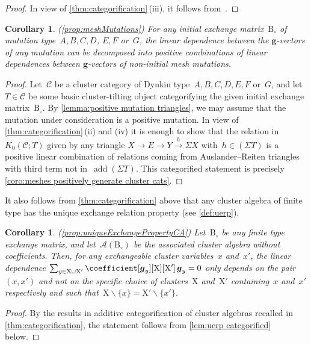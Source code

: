 \documentclass{amsart}
\newtheorem{corollary}[theorem]{Corollary}
\theoremstyle{definition}
\renewcommand{\b}[1]{{\boldsymbol{#1}}} %
\newcommand{\ssm}{\smallsetminus} %
\newcommand{\cluster}{\mathrm{X}} %
\newcommand{\B}{\mathrm{B}} %
\newcommand{\cat}{\mathcal{C}}
\newcommand{\susp}{\Sigma}
\newcommand{\add}{\operatorname{add}}
\begin{document}
\begin{proof}
In view of \cref{thm:categorification}\,(iii), it follows from~\cite[Lem.~3.3]{Palu}.
\end{proof}

\begin{corollary}\emph{(\cref{prop:meshMutations})}
\label{corollary:proof of prop meshMutations}
For any initial exchange matrix~$\B_\circ$ of mutation type~$A, B, C, D$, $E, F$ or~$G$, the linear dependence between the $\b{g}$-vectors of any mutation can be decomposed into positive combinations of linear dependences between $\b{g}$-vectors of non-initial mesh mutations.
\end{corollary}

\begin{proof}
Let~$\cat$ be a cluster category of Dynkin type~$A,B,C,D,E,F$ or~$G$, and let $T\in\cat$ be some basic cluster-tilting object categorifying the given initial exchange matrix~$\B_\circ$. 
By \cref{lemma:positive mutation triangles}, we may assume that the mutation under consideration is a positive mutation.
In view of \cref{thm:categorification}\,(ii) and (iv) it is enough to show that the relation in~$K_0(\cat ; T)$ given by any triangle ${X\to E\to Y\xrightarrow{h} \susp X}$ with~$h\in(\susp T)$ is a positive linear combination of relations coming from Auslander--Reiten triangles with third term not in~$\add(\susp T)$.
This categorified statement is precisely \cref{coro:meshes positively generate cluster cats}.
\end{proof}

It also follows from \cref{thm:categorification} above that any cluster algebra of finite type has the unique exchange relation property (see \cref{def:uerp}).

\begin{corollary}
\label{corollary:UERPforCAproof}
\emph{(\cref{prop:uniqueExchangePropertyCA})}
Let~$\B_\circ$ be any finite type exchange matrix, and let~$\mathcal{A}(\B_\circ)$ be the associated cluster algebra without coefficients.
Then, for any exchangeable cluster variables~$x$ and~$x'$, the linear dependence $\sum_{y \in \cluster \cup \cluster'} \coefficient[{\b{g}_y}][\cluster][\cluster'] \, \b{g}_y = 0$ only depends on the pair~$(x,x')$ and not on the specific choice of clusters~$\cluster$ and~$\cluster'$ containing~$x$ and~$x'$ respectively and such that~${\cluster \ssm \{x\} = \cluster' \ssm \{x'\}}$.
\end{corollary}

\begin{proof}
By the results in additive categorification of cluster algebras recalled in \cref{thm:categorification}, the statement follows from \cref{lem:uerp categorified} below.
\end{proof}
\end{document}

